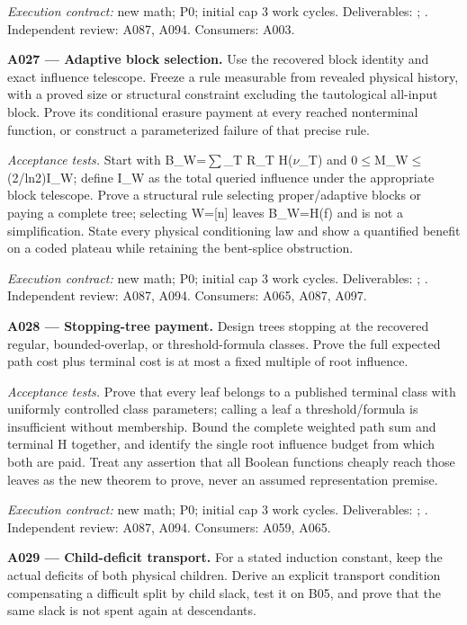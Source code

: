 \documentclass[11pt]{article}
\begin{document}
{\small\emph{Execution contract:} new math; P0; initial cap 3 work cycles. Deliverables: ; . Independent review: A087, A094. Consumers: A003.}

\textbf{A027 --- Adaptive block selection.} Use the recovered block identity and exact influence telescope. Freeze a rule measurable from revealed physical history, with a proved size or structural constraint excluding the tautological all-input block. Prove its conditional erasure payment at every reached nonterminal function, or construct a parameterized failure of that precise rule.

\emph{Acceptance tests.} Start with B\_W=$\sum$\_T R\_T H($\nu$\_T) and 0$\le$M\_W$\le$(2/ln2)I\_W; define I\_W as the total queried influence under the appropriate block telescope. Prove a structural rule selecting proper/adaptive blocks or paying a complete tree; selecting W=[n] leaves B\_W=H(f) and is not a simplification. State every physical conditioning law and show a quantified benefit on a coded plateau while retaining the bent-splice obstruction.

{\small\emph{Execution contract:} new math; P0; initial cap 3 work cycles. Deliverables: ; . Independent review: A087, A094. Consumers: A065, A087, A097.}

\textbf{A028 --- Stopping-tree payment.} Design trees stopping at the recovered regular, bounded-overlap, or threshold-formula classes. Prove the full expected path cost plus terminal cost is at most a fixed multiple of root influence.

\emph{Acceptance tests.} Prove that every leaf belongs to a published terminal class with uniformly controlled class parameters; calling a leaf a threshold/formula is insufficient without membership. Bound the complete weighted path sum and terminal H together, and identify the single root influence budget from which both are paid. Treat any assertion that all Boolean functions cheaply reach those leaves as the new theorem to prove, never an assumed representation premise.

{\small\emph{Execution contract:} new math; P0; initial cap 3 work cycles. Deliverables: ; . Independent review: A087, A094. Consumers: A059, A065.}

\textbf{A029 --- Child-deficit transport.} For a stated induction constant, keep the actual deficits of both physical children. Derive an explicit transport condition compensating a difficult split by child slack, test it on B05, and prove that the same slack is not spent again at descendants.
\end{document}
